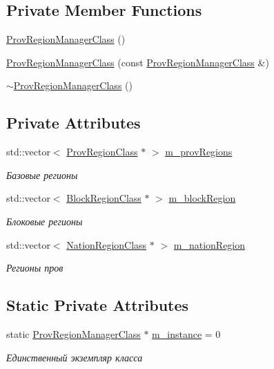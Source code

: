 \subsection*{Private Member Functions}
\begin{DoxyCompactItemize}
\item 
\hyperlink{class_prov_region_manager_class_acef307d34b132e2ff3248ad975765ea2}{Prov\+Region\+Manager\+Class} ()
\item 
\hyperlink{class_prov_region_manager_class_a9b71d36360644aa148a4aa95e8bfe646}{Prov\+Region\+Manager\+Class} (const \hyperlink{class_prov_region_manager_class}{Prov\+Region\+Manager\+Class} \&)
\item 
\hyperlink{class_prov_region_manager_class_afe065bddd41ec18411aa5461e80a57ee}{$\sim$\+Prov\+Region\+Manager\+Class} ()
\end{DoxyCompactItemize}
\subsection*{Private Attributes}
\begin{DoxyCompactItemize}
\item 
std\+::vector$<$ \hyperlink{class_prov_region_class}{Prov\+Region\+Class} $\ast$ $>$ \hyperlink{class_prov_region_manager_class_ab27c4d369607557a4e5c2662c060eea6}{m\+\_\+prov\+Regions}
\begin{DoxyCompactList}\small\item\em Базовые регионы \end{DoxyCompactList}\item 
std\+::vector$<$ \hyperlink{class_block_region_class}{Block\+Region\+Class} $\ast$ $>$ \hyperlink{class_prov_region_manager_class_a9efe4cf012f00b316ce05fe588454fcc}{m\+\_\+block\+Region}
\begin{DoxyCompactList}\small\item\em Блоковые регионы \end{DoxyCompactList}\item 
std\+::vector$<$ \hyperlink{class_nation_region_class}{Nation\+Region\+Class} $\ast$ $>$ \hyperlink{class_prov_region_manager_class_adb7dfea3fe97c915d3f3e0f33bcc5935}{m\+\_\+nation\+Region}
\begin{DoxyCompactList}\small\item\em Регионы пров \end{DoxyCompactList}\end{DoxyCompactItemize}
\subsection*{Static Private Attributes}
\begin{DoxyCompactItemize}
\item 
static \hyperlink{class_prov_region_manager_class}{Prov\+Region\+Manager\+Class} $\ast$ \hyperlink{class_prov_region_manager_class_ab7b0088ad2564be883213fefdf7fabc5}{m\+\_\+instance} = 0
\begin{DoxyCompactList}\small\item\em Единственный экземпляр класса \end{DoxyCompactList}\end{DoxyCompactItemize}


